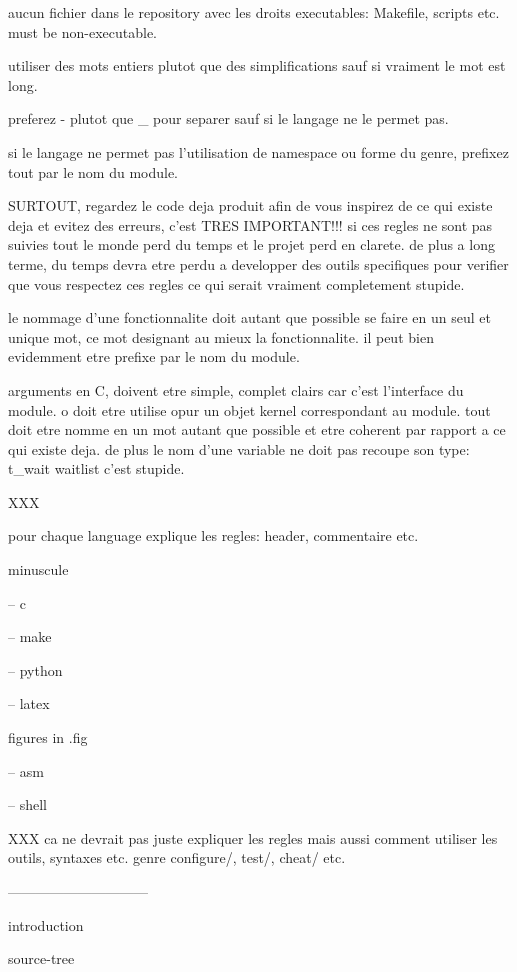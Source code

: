 aucun fichier dans le repository avec les droits executables: Makefile,
scripts etc. must be non-executable.

utiliser des mots entiers plutot que des simplifications sauf si vraiment
le mot est long.

preferez - plutot que _ pour separer sauf si le langage ne le permet pas.

si le langage ne permet pas l'utilisation de namespace ou forme du genre,
prefixez tout par le nom du module.

SURTOUT, regardez le code deja produit afin de vous inspirez de ce qui
existe deja et evitez des erreurs, c'est TRES IMPORTANT!!! si ces regles
ne sont pas suivies tout le monde perd du temps et le projet perd en
clarete. de plus a long terme, du temps devra etre perdu a developper des
outils specifiques pour verifier que vous respectez ces regles ce qui serait
vraiment completement stupide.

le nommage d'une fonctionnalite doit autant que possible se faire en un
seul et unique mot, ce mot designant au mieux la fonctionnalite. il peut bien
evidemment etre prefixe par le nom du module.

arguments en C, doivent etre simple, complet clairs car c'est l'interface
du module. o doit etre utilise opur un objet kernel correspondant au module.
tout doit etre nomme en un mot autant que possible et etre coherent par
rapport a ce qui existe deja. de plus le nom d'une variable ne doit
pas recoupe son type: t_wait waitlist c'est stupide.

XXX

%
%

pour chaque language explique les regles: header, commentaire etc.

minuscule

-- c

-- make

-- python

-- latex

figures in .fig

-- asm

-- shell

XXX
ca ne devrait pas juste expliquer les regles mais aussi comment utiliser
les outils, syntaxes etc. genre configure/, test/, cheat/ etc.

------------------------------

introduction

source-tree

